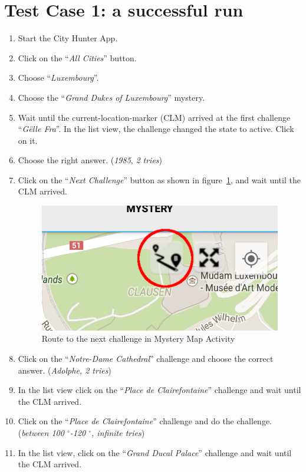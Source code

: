 \section{Test Case 1: a successful run}
\begin{enumerate}
	\item Start the City Hunter App.
	\item Click on the ``\emph{All Cities}'' button.
	\item Choose ``\emph{Luxembourg}''.
	\item Choose the ``\emph{Grand Dukes of Luxembourg}'' mystery.
	\item Wait until the current-location-marker (CLM) arrived at the first challenge ``\emph{Gëlle Fra}''. In the list view, the challenge changed the state to active. Click on it.
	\item Choose the right answer. (\emph{1985}, \emph{2 tries}) 
	\item Click on the ``\emph{Next Challenge}'' button as shown in figure~\ref{fig:nextChallengeButton}, and wait until the CLM arrived.
		\begin{figure}[H]
			\centering
			\includegraphics[scale=0.4]{Figures/NextChallengeButton}
			\caption{Route to the next challenge in Mystery Map Activity}
			\label{fig:nextChallengeButton}
		\end{figure}
	\item Click on the ``\emph{Notre-Dame Cathedral}'' challenge and choose the correct answer. (\emph{Adolphe, 2 tries})
	\item In the list view click on the ``\emph{Place de Clairefontaine}'' challenge and wait until the CLM arrived.
	\item Click on the ``\emph{Place de Clairefontaine}'' challenge and do the challenge. (\emph{between 100 $^{\circ}$-120 $^{\circ}$, infinite tries})
	\item In the list view, click on the ``\emph{Grand Ducal Palace}'' challenge and wait until the CLM arrived.

\end{enumerate}
